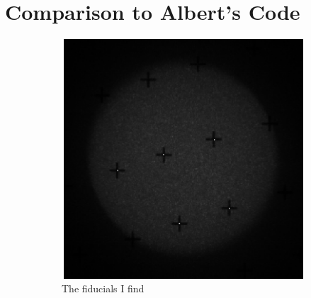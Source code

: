 \documentclass[10pt]{scrartcl}
\begin{document}

\clearpage

\section{Comparison to Albert's Code} %
\label{sec:comparison_to_albert_s_code}

\begin{figure} [!ht]
    \centering
    \hspace{-1.0in}
    \begin{subfigure}[b]{.45\linewidth}
        \centering
        \includegraphics[width=1.3\textwidth]{../plots_tables_images/myfid.eps}
        \caption{The fiducials I find}
    \end{subfigure}
    \hspace{.5in}
    \begin{subfigure}[b]{.45\linewidth}
        \centering

\end{subfigure}
\end{figure}
\end{document}

